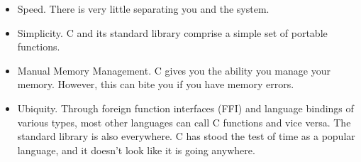 \begin{itemize}
	\item Speed. There is very little separating you and the system.
	\item Simplicity.
    C and its standard library comprise a simple set of portable functions.
	\item Manual Memory Management.
    C gives you the ability you manage your memory.
    However, this can bite you if you have memory errors.
  \item Ubiquity.
    Through foreign function interfaces (FFI) and language bindings of various types, most other languages can call C functions and vice versa.
    The standard library is also everywhere.
    C has stood the test of time as a popular language, and it doesn't look like it is going anywhere.
\end{itemize}


